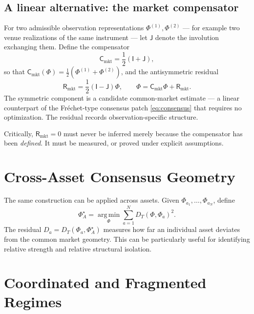 \documentclass[11pt,a4paper]{article}
\numberwithin{equation}{section}
\newcommand{\argmin}{\operatorname*{arg\,min}}
\begin{document}
\subsection*{A linear alternative: the market compensator}

For two admissible observation representations
$\Phi^{(1)},\Phi^{(2)}$ --- for example two venue realizations of
the same instrument --- let $\mathsf{J}$ denote the involution
exchanging them. Define the compensator
\begin{equation}
\mathsf{C}_{\mathrm{mkt}}=\frac12(\mathsf{I}+\mathsf{J}),
\label{eq:compensator}
\end{equation}
so that
$\mathsf{C}_{\mathrm{mkt}}(\Phi)=\tfrac12(\Phi^{(1)}+\Phi^{(2)})$,
and the antisymmetric residual
\begin{equation}
\mathsf{R}_{\mathrm{mkt}}=\frac12(\mathsf{I}-\mathsf{J})\Phi,
\qquad
\Phi=\mathsf{C}_{\mathrm{mkt}}\Phi+\mathsf{R}_{\mathrm{mkt}}.
\label{eq:residual}
\end{equation}
The symmetric component is a candidate common-market estimate --- a
linear counterpart of the Fréchet-type consensus patch
\eqref{eq:consensus} that requires no optimization. The residual
records observation-specific structure.

Critically, $\mathsf{R}_{\mathrm{mkt}}=0$ must never be inferred
merely because the compensator has been \emph{defined}. It must be
measured, or proved under explicit assumptions.

\section{Cross-Asset Consensus Geometry}

The same construction can be applied across assets. Given
$\Phi_{a_1},\ldots,\Phi_{a_N}$, define
\begin{equation}
\Phi_A^\star=\argmin_\Phi\sum_{a=1}^{N}D_T(\Phi,\Phi_a)^2.
\end{equation}
The residual $D_a=D_T(\Phi_a,\Phi_A^\star)$ measures how far an
individual asset deviates from the common market geometry. This can
be particularly useful for identifying relative strength and
relative structural isolation.

\section{Coordinated and Fragmented Regimes}
\end{document}
